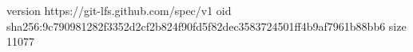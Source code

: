 version https://git-lfs.github.com/spec/v1
oid sha256:9c790981282f3352d2cf2b824f90fd5f82dec3583724501ff4b9af7961b88bb6
size 11077

